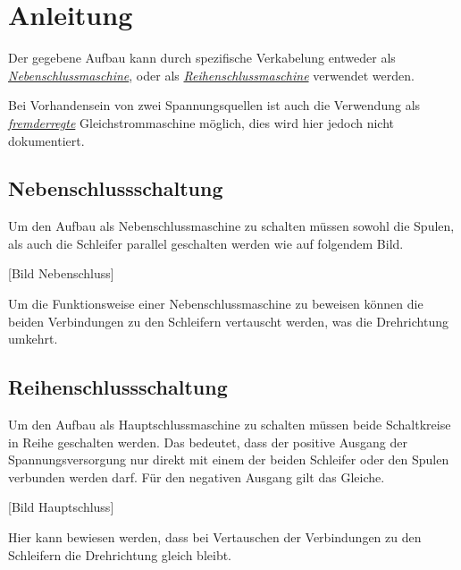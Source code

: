 \section{Anleitung}

Der gegebene Aufbau kann durch spezifische Verkabelung entweder als \hyperref[neben]\textit{{Nebenschlussmaschine}}, oder als \hyperref[reihen]{\textit{Reihenschlussmaschine}} verwendet werden.

Bei Vorhandensein von zwei Spannungsquellen ist auch die Verwendung als \hyperref[fremd]{\textit{fremderregte}} Gleichstrommaschine möglich, dies wird hier jedoch nicht dokumentiert.

\subsection{Nebenschlussschaltung}

Um den Aufbau als Nebenschlussmaschine zu schalten müssen sowohl die Spulen, als auch die Schleifer parallel geschalten werden wie auf folgendem Bild.

[Bild Nebenschluss]

Um die Funktionsweise einer Nebenschlussmaschine zu beweisen können die beiden Verbindungen zu den Schleifern vertauscht werden, was die Drehrichtung umkehrt.

\subsection{Reihenschlussschaltung}

Um den Aufbau als Hauptschlussmaschine zu schalten müssen beide Schaltkreise in Reihe geschalten werden.
Das bedeutet, dass der positive Ausgang der Spannungsversorgung nur direkt mit einem der beiden Schleifer oder den Spulen verbunden werden darf.
Für den negativen Ausgang gilt das Gleiche.

[Bild Hauptschluss]

Hier kann bewiesen werden, dass bei Vertauschen der Verbindungen zu den Schleifern die Drehrichtung gleich bleibt.